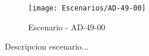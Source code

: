 \begin{figure}[H]
\centering
\texttt{[image: Escenarios/AD-49-00]}
\caption{Escenario - AD-49-00}
\label{fig:AD-49-00}
\end{figure}

Descripcion escenario...
\clearpage
